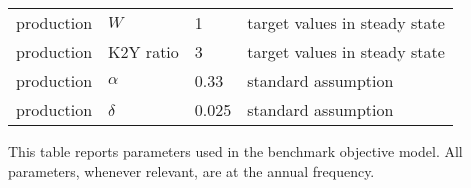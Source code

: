 \begin{table}[p]
\begin{threeparttable}
\begin{tabular}{llll}
production        & $W$                         & 1      & target values in steady state        \\
production        & K2Y ratio                   & 3      & target values in steady state        \\
production        & $\alpha$                    & 0.33   & standard assumption                  \\
production        & $\delta$                    & 0.025  & standard assumption          \\
\hline 
\end{tabular} 
	\begin{flushleft}
		{\footnotesize This table reports parameters used in the benchmark objective model. All parameters, whenever relevant, are at the annual frequency.}
			\end{flushleft}
\end{threeparttable}
\end{table}